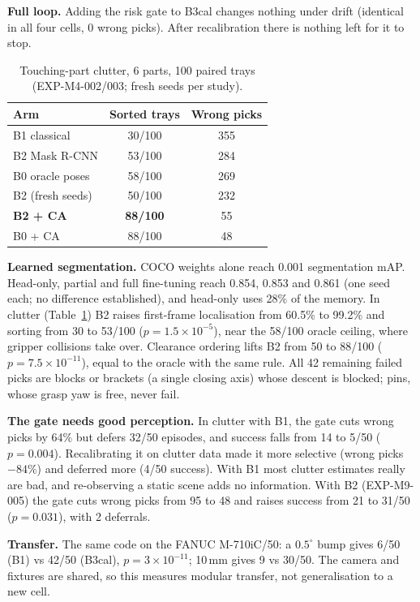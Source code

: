 \documentclass[10pt,twocolumn]{article}
\begin{document}
\textbf{Full loop.} Adding the risk gate to B3cal changes nothing under drift (identical in all four cells, 0 wrong
picks). After recalibration there is nothing left for it to stop.

\begin{table}[t]\centering\small
\caption{Touching-part clutter, 6 parts, 100 paired trays (EXP-M4-002/003; fresh seeds per study).}
\begin{tabular}{lcc}\toprule
Arm & Sorted trays & Wrong picks\\\midrule
B1 classical & 30/100 & 355\\
B2 Mask R-CNN & 53/100 & 284\\
B0 oracle poses & 58/100 & 269\\\midrule
B2 (fresh seeds) & 50/100 & 232\\
\textbf{B2 + CA} & \textbf{88/100} & 55\\
B0 + CA & 88/100 & 48\\\bottomrule
\end{tabular}\label{tab:clutter}\end{table}

\textbf{Learned segmentation.} COCO weights alone reach 0.001 segmentation mAP. Head-only, partial and full fine-tuning
reach 0.854, 0.853 and 0.861 (one seed each; no difference established), and head-only uses 28\% of the memory. In
clutter (Table~\ref{tab:clutter}) B2 raises first-frame localisation from 60.5\% to 99.2\% and sorting from 30 to 53/100
($p=1.5\times10^{-5}$), near the 58/100 oracle ceiling, where gripper collisions take over. Clearance ordering lifts B2
from 50 to 88/100 ($p=7.5\times10^{-11}$), equal to the oracle with the same rule. All 42 remaining failed picks are
blocks or brackets (a single closing axis) whose descent is blocked; pins, whose grasp yaw is free, never fail.

\textbf{The gate needs good perception.} In clutter with B1, the gate cuts wrong picks by 64\% but defers 32/50 episodes,
and success falls from 14 to 5/50 ($p=0.004$). Recalibrating it on clutter data made it more selective (wrong picks
$-84\%$) and deferred more (4/50 success). With B1 most clutter estimates really are bad, and re-observing a static
scene adds no information. With B2 (EXP-M9-005) the gate cuts wrong picks from 95 to 48 and raises success from 21 to
31/50 ($p=0.031$), with 2 deferrals.

\textbf{Transfer.} The same code on the FANUC M-710iC/50: a $0.5^\circ$ bump gives 6/50 (B1) vs 42/50 (B3cal),
$p=3\times10^{-11}$; 10\,mm gives 9 vs 30/50. The camera and fixtures are shared, so this measures modular transfer,
not generalisation to a new cell.
\end{document}
